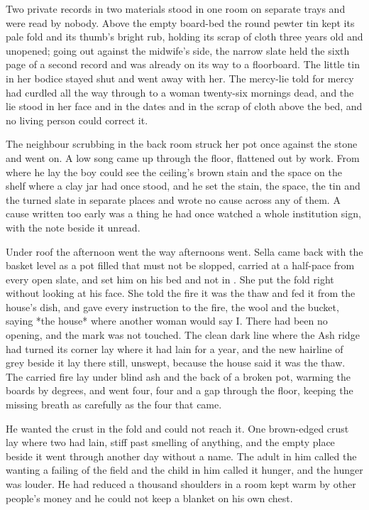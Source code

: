 Two private records in two materials stood in one room on separate trays and were read by nobody. Above the empty board-bed the round pewter tin kept its pale fold and its thumb's bright rub, holding its scrap of cloth three years old and unopened; going out against the midwife's side, the narrow slate held the sixth page of a second record and was already on its way to a floorboard. The little tin in her bodice stayed shut and went away with her. The mercy-lie told for mercy had curdled all the way through to a woman twenty-six mornings dead, and the lie stood in her face and in the dates and in the scrap of cloth above the bed, and no living person could correct it.

The neighbour scrubbing in the back room struck her pot once against the stone and went on. A low song came up through the floor, flattened out by work. From where he lay the boy could see the ceiling's brown stain and the space on the shelf where a clay jar had once stood, and he set the stain, the space, the tin and the turned slate in separate places and wrote no cause across any of them. A cause written too early was a thing he had once watched a whole institution sign, with the note beside it unread.

\scenebreak

Under  roof the afternoon went the way afternoons went. Sella came back with the basket level as a pot filled that must not be slopped, carried at a half-pace from every open slate, and set him on his bed and not in . She put the fold right without looking at his face. She told the fire it was the thaw and fed it from the house's dish, and gave every instruction to the fire, the wool and the bucket, saying *the house* where another woman would say I. There had been no opening, and the mark was not touched. The clean dark line where the Ash ridge had turned its corner lay where it had lain for a year, and the new hairline of grey beside it lay there still, unswept, because the house said it was the thaw. The carried fire lay under blind ash and the back of a broken pot, warming the boards by degrees, and  went four, four and a gap through the floor, keeping the missing breath as carefully as the four that came.

He wanted the crust in the fold and could not reach it. One brown-edged crust lay where two had lain, stiff past smelling of anything, and the empty place beside it went through another day without a name. The adult in him called the wanting a failing of the field and the child in him called it hunger, and the hunger was louder. He had reduced a thousand shoulders in a room kept warm by other people's money and he could not keep a blanket on his own chest.


